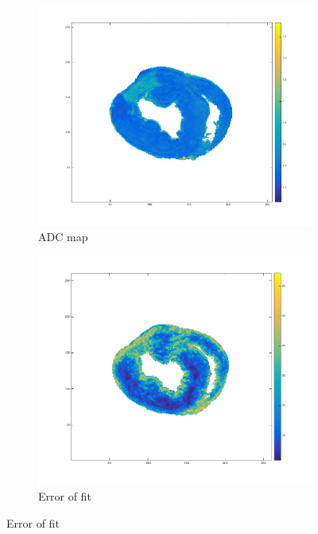 \begin{figure}
    \centering
    \begin{subfigure}{.31\textwidth}
        \includegraphics[width=\textwidth]{figures/pig6_adc_24}
        \caption{ADC map}
        \label{fig:pig6_adc}
    \end{subfigure}
    \begin{subfigure}{.31\textwidth}
        \includegraphics[width=\textwidth]{figures/pig6_err_24}
        \caption{Error of fit}
        \label{fig:pig6_err}
    \end{subfigure}

\end{figure}
